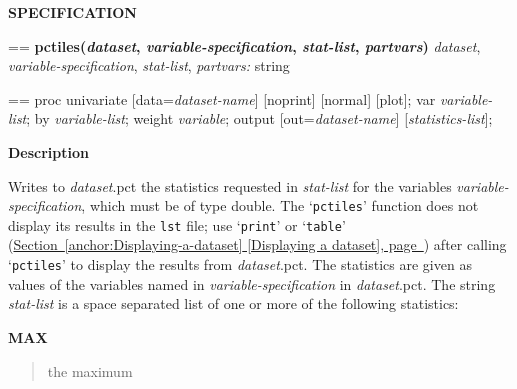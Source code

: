\documentclass{book}
\makeatletter
\newcommand\Texinfocommandstyletextvar[1]{{\normalfont{}\textsl{#1}}}%
\newenvironment{Texinfopreformatted}{%
  \par\GNUTobeylines\obeyspaces\frenchspacing\parskip=\z@\parindent=\z@}{}
{\catcode`\^^M=13 \gdef\GNUTobeylines{\catcode`\^^M=13 \def^^M{\null\par}}}
\newenvironment{Texinfoindented}{\begin{list}{}{}\item\relax}{\end{list}}
\renewcommand{\_}{\Texinfounderscore\discretionary{}{}{}}
\makeatother
\begin{document}
\noindent{}\textbf{SPECIFICATION}
\begin{Texinfoindented}
\begin{Texinfopreformatted}%
\textbf{pctiles(\Texinfocommandstyletextvar{dataset}, \Texinfocommandstyletextvar{variable-specification}, \Texinfocommandstyletextvar{stat-list}, \Texinfocommandstyletextvar{partvars})}
\Texinfocommandstyletextvar{dataset}, \Texinfocommandstyletextvar{variable-specification}, \Texinfocommandstyletextvar{stat-list}, \Texinfocommandstyletextvar{partvars:} string
\end{Texinfopreformatted}
\end{Texinfoindented}

\begin{Texinfoindented}
\begin{Texinfopreformatted}%
proc univariate [data=\Texinfocommandstyletextvar{dataset-name}] [noprint] [normal] [plot];
var \Texinfocommandstyletextvar{variable-list};
by \Texinfocommandstyletextvar{variable-list};
weight \Texinfocommandstyletextvar{variable};
output [out=\Texinfocommandstyletextvar{dataset-name}] [\Texinfocommandstyletextvar{statistics-list}];
\end{Texinfopreformatted}
\end{Texinfoindented}

%

\noindent{}\textbf{Description}

Writes to \Texinfocommandstyletextvar{dataset}.pct the statistics requested in
\Texinfocommandstyletextvar{stat-list} for the variables \Texinfocommandstyletextvar{variable-specification}, which must be
of type double.
The `\texttt{pctiles}' function does not display its results in the \texttt{lst} file; use
`\texttt{print}' or `\texttt{table}' (\hyperref[anchor:Displaying-a-dataset]{Section~\ref*{anchor:Displaying-a-dataset} [Displaying a dataset], page~\pageref*{anchor:Displaying-a-dataset}}) after calling
`\texttt{pctiles}' to display the results from \Texinfocommandstyletextvar{dataset}.pct.
The statistics are given as values of the variables named in \Texinfocommandstyletextvar{variable-specification}
in \Texinfocommandstyletextvar{dataset}.pct.
The string \Texinfocommandstyletextvar{stat-list}
is a space separated list of one or more of the following statistics:

\textbf{MAX}
\begin{quote}
the maximum
\end{quote}
%
\end{document}
